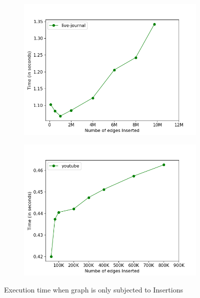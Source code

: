 \documentclass[a4paper]{article}
\begin{document}
\begin{figure}[H]
\begin{subfigure}[b]{0.45\textwidth}
         \includegraphics[width=\textwidth]{img/ins/i2.png}
         \caption{}
         \label{fig:insert_trend_3}
    \end{subfigure}
    \hfill
    \begin{subfigure}[b]{0.45\textwidth}
         \centering
         \includegraphics[width=\textwidth]{img/ins/i3.png}
         \caption{}
         \label{fig:insert_trend_4}
    \end{subfigure}
    
    \caption{Execution time when graph is only subjected to Insertions}%
    \label{fig:insert_trend}
\end{figure}
\end{document}
